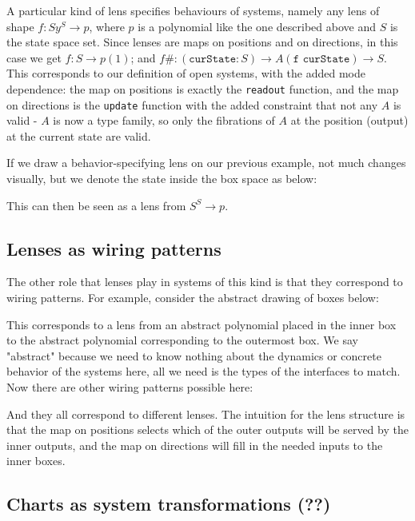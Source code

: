A particular kind of lens specifies behaviours of systems, namely any lens of shape $f : Sy^S \rightarrow p$, where $p$ is a polynomial like the one described above and $S$ is the state space set. Since lenses are maps on positions and on directions, in this case we get $f : S \rightarrow p(1)$; and $f\# : (\texttt{curState}: S) \rightarrow A (\texttt{f curState}) \rightarrow S$. This corresponds to our definition of open systems, with the added mode dependence: the map on positions is exactly the \texttt{readout} function, and the map on directions is the \texttt{update} function with the added constraint that not any $A$ is valid - $A$ is now a type family, so only the fibrations of $A$ at the position (output) at the current state are valid.

If we draw a behavior-specifying lens on our previous example, not much changes visually, but we denote the state inside the box space as below:


This can then be seen as a lens from $S^S \rightarrow p$.

\subsection{Lenses as wiring patterns}

The other role that lenses play in systems of this kind is that they correspond to wiring patterns. For example, consider the abstract drawing of boxes below:


This corresponds to a lens from an abstract polynomial placed in the inner box to the abstract polynomial corresponding to the outermost box. We say "abstract" because we need to know nothing about the dynamics or concrete behavior of the systems here, all we need is the types of the interfaces to match. Now there are other wiring patterns possible here:


And they all correspond to different lenses. The intuition for the lens structure is that the map on positions selects which of the outer outputs will be served by the inner outputs, and the map on directions will fill in the needed inputs to the inner boxes.

\subsection{Charts as system transformations (??)}

